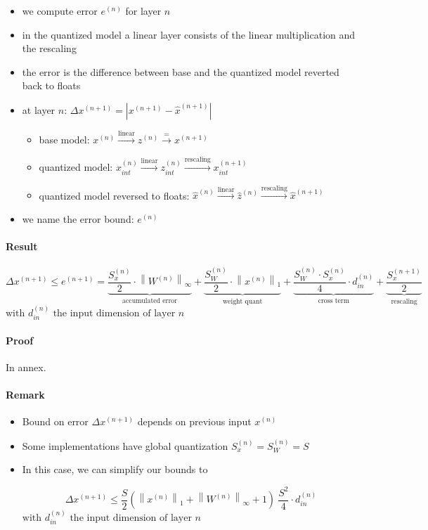 \documentclass[11pt, a4paper]{article}
\newcommand{\norm}[1]{\left\|#1\right\|}
\newcommand{\Wn}{W^{(n)}}
\newcommand{\xn}{x^{(n)}}
\newcommand{\SWn}{S_W^{(n)}}
\newcommand{\Sxn}{S_x^{(n)}}
\newcommand{\Sxnpo}{S_x^{(n+1)}}
\newcommand{\en}{e^{(n)}}
\newcommand{\enpo}{e^{(n+1)}}
\newcommand{\xnpo}{x^{(n+1)}}
\newcommand{\xnpoh}{\hat{x}^{(n+1)}}
\begin{document}
\begin{itemize}
	\item we compute error $\en$ for layer $n$
	\item in the quantized model a linear layer consists of the linear multiplication and the rescaling
	\item the error is the difference between base and the quantized model reverted back to floats
	\item at layer $n$: $\Delta \xnpo = |\xnpo - \xnpoh|$
	\begin{itemize}
    	\item  base model:
    	$x^{(n)} \xrightarrow{\text{linear}} z^{(n)} \xrightarrow{\text{=}} x^{(n+1)}$
    	\item quantized model: $x^{(n)}_{int}
    	\xrightarrow{\text{linear}} z^{(n)}_{int}
    	\xrightarrow{\text{rescaling}} x^{(n+1)}_{int} $
    	\item quantized model reversed to floats: $\hat{x}^{(n)}
    	\xrightarrow{\text{linear}} \hat{z}^{(n)}
    	\xrightarrow{\text{rescaling}} \hat{x}^{(n+1)} $
	\end{itemize}
	\item we name the error bound: $\en$
\end{itemize}

\paragraph{Result}
\begin{equation}
\boxed{
\Delta \xnpo \leq
\enpo =
\underbrace{\frac{\Sxn}{2} \cdot \norm{\Wn}_{\infty}}_{\text{accumulated error}} +
\underbrace{\frac{\SWn}{2} \cdot \norm{\xn}_1}_{\text{weight quant}} +
\underbrace{\frac{\SWn \cdot \Sxn}{4} \cdot d_{in}^{(n)}}_{\text{cross term}} +
\underbrace{\frac{\Sxnpo}{2}}_{\text{rescaling}}
}
\end{equation}
$\text{with } d_{in}^{(n)} \text{ the input dimension of layer } n$

\paragraph{Proof}
In annex.

\paragraph{Remark}
\begin{itemize}
\item Bound on error $\Delta \xnpo$ depends on previous input $x^{(n)}$
\item Some implementations have global quantization $\Sxn = \SWn = S$
\item In this case, we can simplify our bounds to

$$
\Delta \xnpo \leq
\frac{S}{2} \left( \norm{\xn}_1 + \norm{\Wn}_{\infty} + 1 \right)
\ \frac{S^{2}}{4} \cdot d_{in}^{(n)}
$$
$\text{with } d_{in}^{(n)} \text{ the input dimension of layer } n$

\end{itemize}
\end{document}
